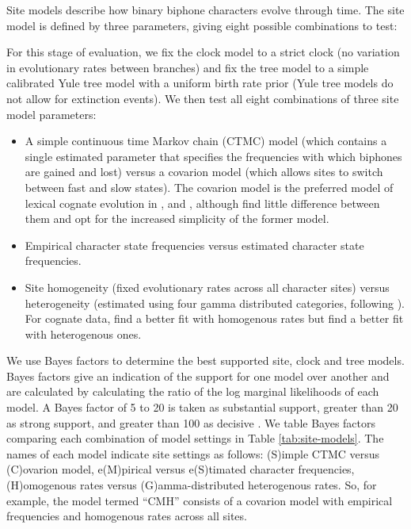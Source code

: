 \documentclass[]{article}
\providecommand{\tightlist}{%
  \setlength{\itemsep}{0pt}\setlength{\parskip}{0pt}}
\begin{document}
Site models describe how binary biphone characters evolve through time. The site model is defined by three parameters, giving eight possible combinations to test:

For this stage of evaluation, we fix the clock model to a strict clock (no variation in evolutionary rates between branches) and fix the tree model to a simple calibrated Yule tree model with a uniform birth rate prior (Yule tree models do not allow for extinction events). We then test all eight combinations of three site model parameters:

\begin{itemize}
\tightlist
\item
  A simple continuous time Markov chain (CTMC) model (which contains a single estimated parameter that specifies the frequencies with which biphones are gained and lost) versus a covarion model (which allows sites to switch between fast and slow states). The covarion model is the preferred model of lexical cognate evolution in \textcite{bouckaert_corrections_2012}, \textcite{bouckaert_origin_2018} and \textcite{kolipakam_bayesian_2018}, although \textcite[p.~219]{chang_ancestry-constrained_2015} find little difference between them and opt for the increased simplicity of the former model.
\item
  Empirical character state frequencies versus estimated character state frequencies.
\item
  Site homogeneity (fixed evolutionary rates across all character sites) versus heterogeneity (estimated using four gamma distributed categories, following \textcite{kolipakam_bayesian_2018}). For cognate data, \textcite{bouckaert_origin_2018} find a better fit with homogenous rates but \textcite{kolipakam_bayesian_2018} find a better fit with heterogenous ones.
\end{itemize}

We use Bayes factors \autocite{kass_bayes_1995} to determine the best supported site, clock and tree models. Bayes factors give an indication of the support for one model over another and are calculated by calculating the ratio of the log marginal likelihoods of each model. A Bayes factor of 5 to 20 is taken as substantial support, greater than 20 as strong support, and greater than 100 as decisive \autocite{kass_bayes_1995}. We table Bayes factors comparing each combination of model settings in Table \ref{tab:site-models}. The names of each model indicate site settings as follows: (S)imple CTMC versus (C)ovarion model, e(M)pirical versus e(S)timated character frequencies, (H)omogenous rates versus (G)amma-distributed heterogenous rates. So, for example, the model termed ``CMH'' consists of a covarion model with empirical frequencies and homogenous rates across all sites.
\end{document}
